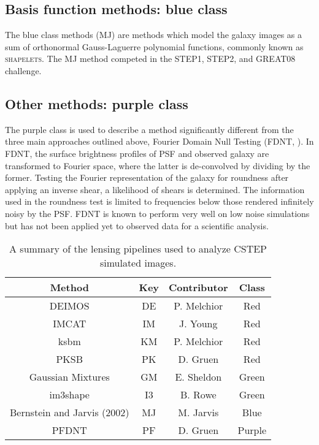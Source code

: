 \subsection{Basis function methods: blue class}
The blue class methods (MJ) are methods which model the
galaxy images as a sum of orthonormal Gauss-Laguerre polynomial
functions, commonly known as \textsc{shapelets}. The MJ
method competed in the STEP1, STEP2, and GREAT08 challenge. 


\subsection{Other methods: purple class}
The purple class is used to describe a method significantly different from the
three main approaches outlined above, Fourier Domain Null Testing (FDNT,
\citealt{Bern}). In FDNT, the surface brightness profiles of PSF and
observed galaxy are transformed to Fourier space, where the latter is
de-convolved by dividing by the former. Testing the Fourier
representation of the galaxy for roundness after applying an inverse
shear, a likelihood of shears is determined. The information used in
the roundness test is limited to frequencies below those rendered
infinitely noisy by the PSF. FDNT is known to perform very well on low
noise simulations \citep{Bern} but has not been applied yet to
observed data for a scientific analysis.
 
\begin{table}
\begin{center}
  \begin{tabular}{| c | c | c| c | }
    \hline 
     Method & Key & Contributor & Class \\
    \hline
     DEIMOS & DE &  P. Melchior & Red  \\
    \hline
    IMCAT & IM & J. Young & Red  \\
    \hline
    ksbm &  KM & P. Melchior &  Red \\
    \hline
    PKSB & PK & D. Gruen & Red \\
    \hline
     Gaussian Mixtures & GM & E. Sheldon & Green \\
    \hline
     im3shape &  I3 &  B. Rowe & Green \\
    \hline
     Bernstein and Jarvis (2002) & MJ &  M. Jarvis & Blue \\
    \hline
     PFDNT &  PF & D. Gruen & Purple \\
    \hline
  \end{tabular}
\end{center}
\caption{ A summary of the lensing pipelines used to analyze CSTEP simulated images. }
\label{table:smp}
\end{table}
